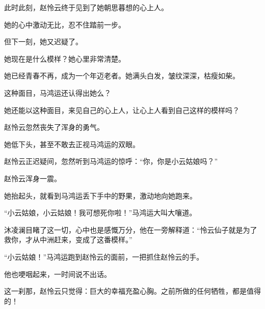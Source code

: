 \begin{this_body}
此时此刻，赵怜云终于见到了她朝思暮想的心上人。

她的心中激动无比，忍不住踏前一步。

但下一刻，她又迟疑了。

她现在是什么模样？她心里非常清楚。

她已经青春不再，成为一个年迈老者。她满头白发，皱纹深深，枯瘦如柴。

这种面目，马鸿运还认得出她么？

她还能以这种面目，来见自己的心上人，让心上人看到自己这样的模样吗？

赵怜云忽然丧失了浑身的勇气。

她低下头，甚至不敢去正视马鸿运的双眼。

赵怜云正迟疑间，忽然听到马鸿运的惊呼：“你，你是小云姑娘吗？”

赵怜云浑身一震。

她抬起头，就看到马鸿运丢下手中的野果，激动地向她跑来。

“小云姑娘，小云姑娘！我可想死你啦！”马鸿运大叫大嚷道。

沐凌澜目睹了这一切，心中也是感慨万分，他在一旁解释道：“怜云仙子就是为了救你，才从中洲赶来，变成了这番模样。”

“小云姑娘！”马鸿运跑到赵怜云的面前，一把抓住赵怜云的手。

他也哽咽起来，一时间说不出话。

这一刹那，赵怜云只觉得：巨大的幸福充盈心胸。之前所做的任何牺牲，都是值得的！

\end{this_body}


